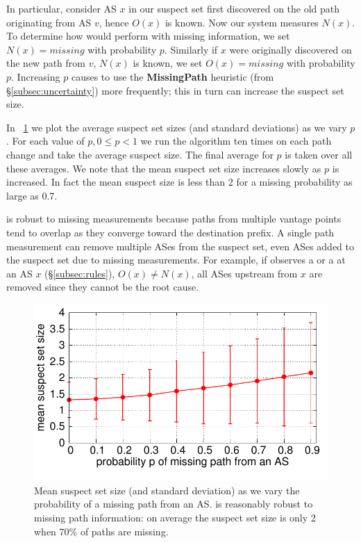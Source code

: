 In particular, consider AS $x$ in our suspect set first discovered on the old path 
originating from AS $v$, hence $O(x)$ is known. Now our system measures 
$N(x)$. To determine how \ouralgo would 
perform with missing information, we set $N(x)=\mathit{missing}$ with probability $p$.
Similarly if $x$ were originally discovered on the new path from $v$, \ie 
$N(x)$ is known, we set $O(x)=\mathit{missing}$ with probability $p$.
Increasing $p$ causes \ouralgo to use the \textbf{MissingPath}
heuristic (from \S\ref{subsec:uncertainty}) more frequently; this in turn can increase 
the suspect set size. 

In \fig~\ref{fig:p-cdf} we plot the average suspect set sizes (and standard deviations) as 
we vary $p$. For each value of 
$p, 0 \leq p < 1$ we run the algorithm ten times on each path change and take the average 
suspect size. The final average for $p$ is taken over all these averages. We note that
the mean suspect set size increases slowly as $p$ is increased.
In fact the mean suspect size is less than 2 for a missing probability as large as 0.7. 

\ouralgo is robust to missing measurements because 
paths from multiple vantage points tend to overlap as they converge
toward the destination prefix. A single path measurement can remove
multiple ASes from the suspect set, even ASes added to the suspect set
due to missing measurements. For example, if \ouralgo observes a
\localC{} or a \neighborC{} at an AS $x$ (\S\ref{subsec:rules}), \ie $O(x) \neq N(x)$, all ASes upstream from $x$ are removed
since they cannot be the root cause. 

\begin{figure}[tbp]
\centering
\includegraphics[width=\columnwidth]{figs/p-cdf.pdf} 
\vspace{-2em}
\caption{Mean suspect set size (and standard deviation) as we vary 
the probability of a missing path from an AS. \ouralgo is reasonably 
robust to missing path information: on average the suspect set size is 
only 2 when 70\% of paths are missing. }  
\label{fig:p-cdf} 
\vspace{.5em}
\end{figure}


